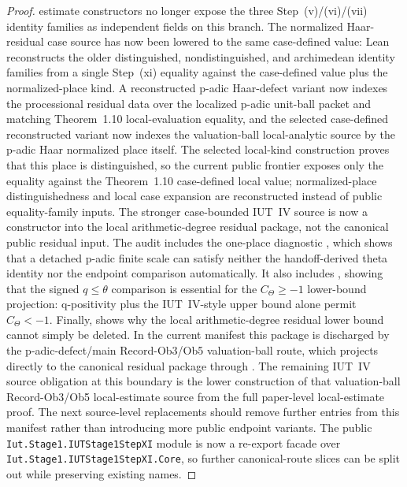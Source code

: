 \begin{proof}
  estimate constructors no longer expose the three Step~(v)/(vi)/(vii)
  identity families as independent fields on this branch.  The normalized
  Haar-residual case source has now been lowered to the same case-defined
  value: Lean reconstructs the older distinguished, nondistinguished, and
  archimedean identity families from a single Step~(xi) equality against the
  case-defined value plus the normalized-place kind.  A reconstructed p-adic
  Haar-defect variant now indexes the processional residual data over the
  localized p-adic unit-ball packet and matching Theorem~1.10 local-evaluation
  equality, and the selected case-defined reconstructed variant now indexes the
  valuation-ball local-analytic source by the p-adic Haar normalized place
  itself.  The selected local-kind construction proves that this place is
  distinguished, so the current public frontier exposes only the equality
  against the Theorem~1.10 case-defined local value; normalized-place
  distinguishedness and local case expansion are reconstructed instead of
  public equality-family inputs.  The stronger case-bounded
  IUT~IV source is now a constructor into the local arithmetic-degree residual
  package, not the canonical public residual input.  The audit includes the
  one-place diagnostic
  ,
  which shows that a detached p-adic finite scale can satisfy neither the
  handoff-derived theta identity nor the endpoint comparison automatically.
  It also includes
  ,
  showing that the signed \(q\leq\theta\) comparison is essential for the
  \(C_\Theta\ge -1\) lower-bound projection: q-positivity plus the IUT~IV-style
  upper bound alone permit \(C_\Theta<-1\).  Finally,
  shows why the local arithmetic-degree residual lower bound cannot simply be
  deleted.  In the current manifest this package is discharged by the
  p-adic-defect/main Record-Ob3/Ob5 valuation-ball route, which projects
  directly to the canonical residual package through
  .
  The remaining IUT~IV source obligation at this boundary is the lower
  construction of that valuation-ball Record-Ob3/Ob5 local-estimate source from
  the full paper-level local-estimate proof.  The
  next source-level replacements should remove further entries from this
  manifest rather than introducing more public endpoint variants.  The public
  \texttt{Iut.Stage1.IUTStage1StepXI} module is now a
  re-export facade over \texttt{Iut.Stage1.IUTStage1StepXI.Core}, so further
  canonical-route slices can be split out while preserving existing names.
\end{proof}

